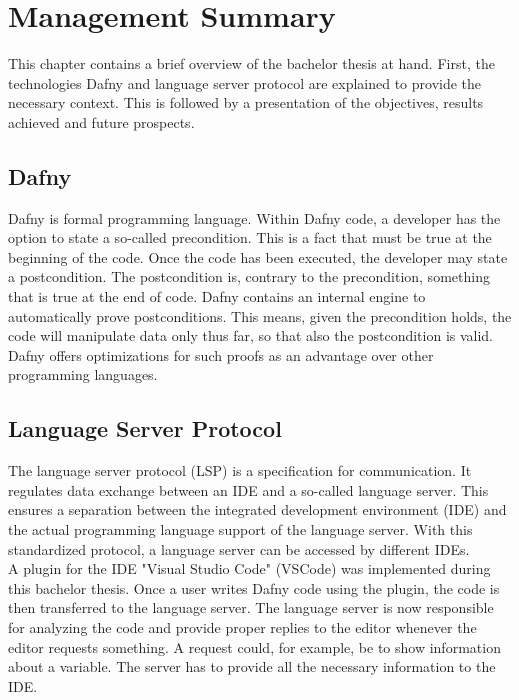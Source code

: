 \section{Management Summary}
\label{section:management_summary}

This chapter contains a brief overview of the bachelor thesis at hand.
First, the technologies Dafny and language server protocol are explained to provide the necessary context.
This is followed by a presentation of the objectives, results achieved and future prospects.

\subsection{Dafny}
\label{section:management_summary:dafny}
Dafny is formal programming language.
Within Dafny code, a developer has the option to state a so-called precondition.
This is a fact that must be true at the beginning of the code.
Once the code has been executed, the developer may state a postcondition.
The postcondition is, contrary to the precondition, something that is true at the end of code.
Dafny contains an internal engine to automatically prove postconditions.
This means, given the precondition holds, the code will manipulate data only thus far, so that also the postcondition is valid.
Dafny offers optimizations for such proofs as an advantage over other programming languages.

\subsection{Language Server Protocol}
\label{section:management_summary:lsp}
The language server protocol (LSP) is a specification for communication. 
It regulates data exchange between an IDE and a so-called language server.
This ensures a separation between the integrated development environment (IDE) and the actual programming language support of the language server. 
With this standardized protocol, a language server can be accessed by different IDEs. \\

A plugin for the IDE "Visual Studio Code" (VSCode) was implemented during this bachelor thesis. 
Once a user writes Dafny code using the plugin, the code is then transferred to the language server.
The language server is now responsible for analyzing the code and provide proper replies to the editor whenever the editor requests something.
A request could, for example, be to show information about a variable.
The server has to provide all the necessary information to the IDE.\\

